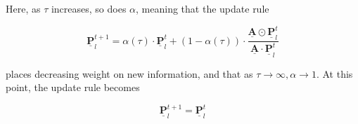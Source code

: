 Here, as $\tau$ increases, so does $\alpha$, meaning that the update rule

\begin{equation} 
    \underline{\mathbf{P}}^{t+1}_l = \alpha(\tau) \cdot \underline{\mathbf{P}}^{t}_l + (1 - \alpha(\tau)) \cdot  \frac{\underline{\mathbf{A}} \odot \underline{\mathbf{P}}^t_l}{\underline{\mathbf{A}} \cdot \underline{\mathbf{P}}^t_l}
\end{equation}

places decreasing weight on new information, and that as $\tau \rightarrow \infty, \alpha \rightarrow 1$. At this point, the update rule becomes

\begin{equation} 
    \underline{\mathbf{P}}^{t+1}_l = \underline{\mathbf{P}}^{t}_l 
\end{equation}
